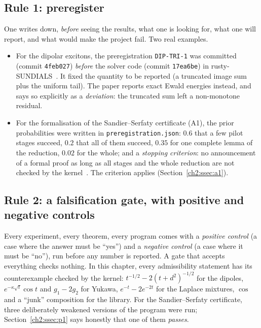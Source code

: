 \subsection{Rule 1: preregister}\label{ch2:ssec:prereg}
One writes down, \emph{before} seeing the results, what one is looking for, what one will report, and what would make the
project fail. Two real examples.
\begin{itemize}
\item For the dipolar excitons, the preregistration \texttt{DIP-TRI-1} was committed (commit
\texttt{4feb027}) \emph{before} the solver code (commit \texttt{17ea6be}) in rusty-SUNDIALS~\cite{ch2dip}. It fixed
the quantity to be reported (a truncated image sum plus the uniform tail). The paper reports exact Ewald energies
instead, and says so explicitly as a \emph{deviation}: the truncated sum left a non-monotone residual.
\item For the formalisation of the Sandier--Serfaty certificate (A1), the prior probabilities were written in
\texttt{preregistration.json}: $0.6$ that a few pilot stages succeed, $0.2$ that all of them succeed, $0.35$
for one complete lemma of the reduction, $0.02$ for the whole; and a \emph{stopping criterion}: no announcement of a formal
proof as long as all stages and the whole reduction are not checked by the kernel~\cite{ch2ssl}. The criterion
applies (Section~\ref{ch2:ssec:a1}).
\end{itemize}

\subsection{Rule 2: a falsification gate, with positive and negative controls}\label{ch2:ssec:falsif}
Every experiment, every theorem, every program comes with a \emph{positive control} (a case where the answer must be
``yes'') and a \emph{negative control} (a case where it must be ``no''), run before any number is reported. A gate that
accepts everything checks nothing. In this chapter, every admissibility statement has its counterexample checked by the
kernel: $t^{-1/2}-2(t+d^2)^{-1/2}$ for the dipoles, $e^{-\kappa\sqrt t}\cos t$ and $g_1-2g_2$ for
Yukawa, $e^{-t}-2e^{-2t}$ for the Laplace mixtures, $\cos$ and a ``junk'' composition for the library.
For the Sandier--Serfaty certificate, three deliberately weakened versions of the program were run; Section~\ref{ch2:ssec:p1}
says honestly that one of them \emph{passes}.

